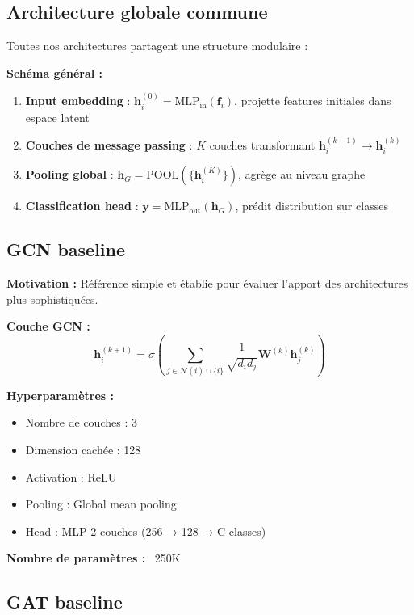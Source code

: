 \subsection{Architecture globale commune}

Toutes nos architectures partagent une structure modulaire :

\textbf{Schéma général :}
\begin{enumerate}
    \item \textbf{Input embedding} : $\mathbf{h}_i^{(0)} = \text{MLP}_{\text{in}}(\mathbf{f}_i)$, projette features initiales dans espace latent
    \item \textbf{Couches de message passing} : $K$ couches transformant $\mathbf{h}_i^{(k-1)} \rightarrow \mathbf{h}_i^{(k)}$
    \item \textbf{Pooling global} : $\mathbf{h}_G = \text{POOL}(\{\mathbf{h}_i^{(K)}\})$, agrège au niveau graphe
    \item \textbf{Classification head} : $\mathbf{y} = \text{MLP}_{\text{out}}(\mathbf{h}_G)$, prédit distribution sur classes
\end{enumerate}

\subsection{GCN baseline}

\textbf{Motivation :}
Référence simple et établie pour évaluer l'apport des architectures plus sophistiquées.

\textbf{Couche GCN :}
\[
\mathbf{h}_i^{(k+1)} = \sigma\left(\sum_{j \in \mathcal{N}(i) \cup \{i\}} \frac{1}{\sqrt{d_i d_j}} \mathbf{W}^{(k)}\mathbf{h}_j^{(k)}\right)
\]

\textbf{Hyperparamètres :}
\begin{itemize}
    \item Nombre de couches : 3
    \item Dimension cachée : 128
    \item Activation : ReLU
    \item Pooling : Global mean pooling
    \item Head : MLP 2 couches (256 → 128 → C classes)
\end{itemize}

\textbf{Nombre de paramètres :} ~250K

\subsection{GAT baseline}

